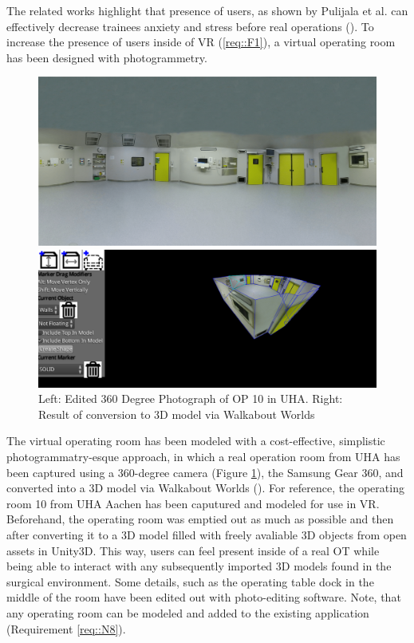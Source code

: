 The related works highlight that presence of users, as shown by Pulijala et al. can effectively decrease trainees anxiety and stress before real operations (\cite{Pulijala.2017}).
To increase the presence of users inside of VR (\ref{req::F1}), a virtual operating room has been designed with photogrammetry.

\begin{figure}[ht]
    \centering
    \begin{minipage}{.5\textwidth}
      \centering
      \includegraphics[width=0.95\linewidth]{images/implementation/operating_room_360.png}
    \end{minipage}%
    \begin{minipage}{.5\textwidth}
      \centering
      \includegraphics[width=0.95\linewidth]{images/implementation/walkabout_worlds.png}
    \end{minipage}
    \caption{\label{fig::360OperatingRoom}Left: Edited 360 Degree Photograph of OP 10 in UHA. Right: Result of conversion to 3D model via Walkabout Worlds}
\end{figure}

The virtual operating room has been modeled with a cost-effective, simplistic photogrammatry-esque approach, in which a real operation room from UHA has been captured using a 
360-degree camera (Figure \ref{fig::360OperatingRoom}), the Samsung Gear 360, and converted into a 3D model via Walkabout Worlds (\cite{WalkaboutWorlds}).
For reference, the operating room 10 from UHA Aachen has been caputured and modeled for use in VR.
Beforehand, the operating room was emptied out as much as possible and then after converting it to a 3D model filled with freely avaliable 3D objects from open assets in Unity3D.
This way, users can feel present inside of a real OT while being able to interact with any subsequently imported 3D models found in the surgical environment.
Some details, such as the operating table dock in the middle of the room have been edited out with photo-editing software.
Note, that any operating room can be modeled and added to the existing application (Requirement \ref{req::N8}).


